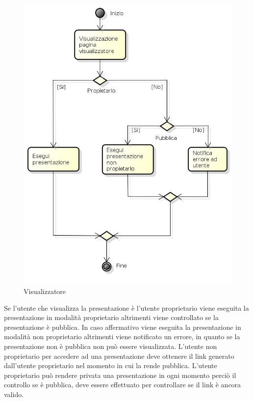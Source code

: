 \begin{figure}[h!]
		\centering
		\includegraphics[scale=.5]{img/Visualizzatore.jpg}
		\caption{Visualizzatore}
		\label{fig:Visualizzatore}
\end{figure} 

Se l'utente che visualizza la presentazione è l'utente proprietario viene eseguita la presentazione in modalità proprietario altrimenti viene controllato se la presentazione è pubblica. In caso affermativo viene eseguita la presentazione in modalità non proprietario altrimenti viene notificato un errore, in quanto se la presentazione non è pubblica non può essere visualizzata. L'utente non proprietario per accedere ad una presentazione deve ottenere il link generato dall'utente proprietario nel momento in cui la rende pubblica. L'utente proprietario può rendere privata una presentazione in ogni momento perciò il controllo se è pubblica, deve essere effettuato per controllare se il link è ancora valido.

